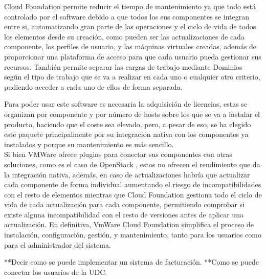 Cloud Foundation permite reducir el tiempo de mantenimiento ya que todo está controlado por el software debido a que todos los sus componentes se integran entre si, automatizando gran parte de las operaciones y el ciclo de vida de todos los elementos desde su creación, como pueden ser las actualizaciones de cada componente, los perfiles de usuario, y las máquinas virtuales creadas, además de proporcionar una plataforma de acceso para que cada usuario pueda gestionar sus recursos.
También permite separar las cargas de trabajo mediante Dominios según el tipo de trabajo que se va a realizar en cada uno o cualquier otro criterio, pudiendo acceder a cada uno de ellos de forma separada. 




Para poder usar este software es necesaria la adquisición de licencias, estas se organizan por componente y por número de hosts sobre los que se va a instalar el producto, haciendo que el coste sea elevado, pero, a pesar de eso, se ha elegido este paquete principalmente por su integración nativa con los componentes ya instalados y porque su mantenimiento es más sencillo. \\
Si bien VMWare ofrece plugins para conectar sus componentes con otras soluciones, como es el caso de OpenStack \cite{opestackintegrated}, estos no ofrecen el rendimiento que da la integración nativa, además, en caso de actualizaciones habría que actualizar cada componente de forma individual aumentando el riesgo de incompatibilidades con el resto de elementos mientras que Cloud Foundation gestiona todo el ciclo de vida de cada actualización para cada componente, permitiendo comprobar si existe alguna incompatibilidad con el resto de versiones antes de aplicar una actualización. En definitiva, VmWare Cloud Foundation simplifica el proceso de instalación, configuración, gestión, y mantenimiento, tanto para los usuarios como para el administrador del sistema.


**Decir como se puede implementar un sistema de facturación.
**Como se puede conectar los usuarios de la UDC.

